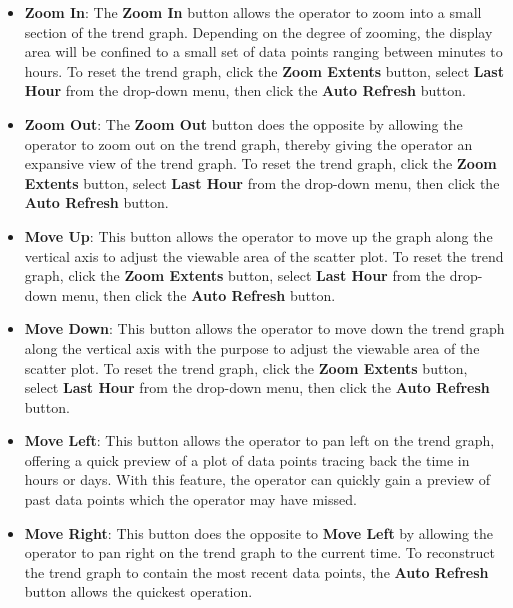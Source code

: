 \begin{enumerate}
  \begin{itemize}
  \item
    \textbf{Zoom In}: The \textbf{Zoom In} button allows the operator to
    zoom into a small section of the trend graph. Depending on the
    degree of zooming, the display area will be confined to a small set
    of data points ranging between minutes to hours. To reset the trend
    graph, click the \textbf{Zoom Extents} button, select \textbf{Last
    Hour} from the drop-down menu, then click the \textbf{Auto Refresh}
    button.
  \item
    \textbf{Zoom Out}: The \textbf{Zoom Out} button does the opposite by
    allowing the operator to zoom out on the trend graph, thereby giving
    the operator an expansive view of the trend graph. To reset the
    trend graph, click the \textbf{Zoom Extents} button, select
    \textbf{Last Hour} from the drop-down menu, then click the
    \textbf{Auto Refresh} button.
  \item
    \textbf{Move Up}: This button allows the operator to move up the
    graph along the vertical axis to adjust the viewable area of the
    scatter plot. To reset the trend graph, click the \textbf{Zoom
    Extents} button, select \textbf{Last Hour} from the drop-down menu,
    then click the \textbf{Auto Refresh} button.
  \item
    \textbf{Move Down}: This button allows the operator to move down the
    trend graph along the vertical axis with the purpose to adjust the
    viewable area of the scatter plot. To reset the trend graph, click
    the \textbf{Zoom Extents} button, select \textbf{Last Hour} from the
    drop-down menu, then click the \textbf{Auto Refresh} button.
  \item
    \textbf{Move Left}: This button allows the operator to pan left on
    the trend graph, offering a quick preview of a plot of data points
    tracing back the time in hours or days. With this feature, the
    operator can quickly gain a preview of past data points which the
    operator may have missed.
  \item
    \textbf{Move Right}: This button does the opposite to \textbf{Move
    Left} by allowing the operator to pan right on the trend graph to
    the current time. To reconstruct the trend graph to contain the most
    recent data points, the \textbf{Auto Refresh} button allows the
    quickest operation.
  \end{itemize}
\end{enumerate}


